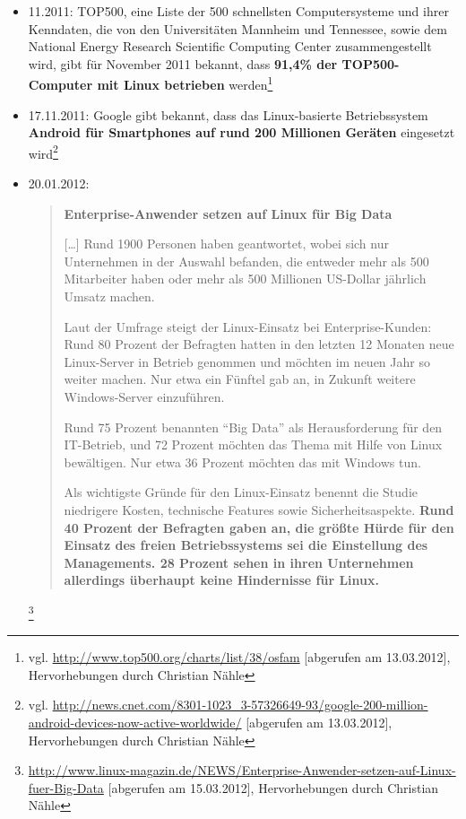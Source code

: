 \documentclass[a4paper]{scrartcl}
\begin{document}
\begin{itemize}
\item 11.2011: TOP500, eine Liste der 500 schnellsten Computersysteme und ihrer
  Kenndaten, die von den Universitäten Mannheim und Tennessee, sowie dem
  National Energy Research Scientific Computing Center zusammengestellt wird,
  gibt für November 2011 bekannt, dass \textbf{91,4\% der TOP500-Computer mit
    Linux betrieben}
  werden\footnote{vgl. \url{http://www.top500.org/charts/list/38/osfam}
    [abgerufen am 13.03.2012], Hervorhebungen durch Christian Nähle}

\item 17.11.2011: Google gibt bekannt, dass das Linux-basierte Betriebssystem
  \textbf{Android für Smartphones auf rund 200 Millionen Geräten} eingesetzt
  wird\footnote{vgl.
    \url{http://news.cnet.com/8301-1023_3-57326649-93/google-200-million-android-devices-now-active-worldwide/}
    [abgerufen am 13.03.2012], Hervorhebungen durch Christian Nähle}

\item 20.01.2012: \begin{quote}\textbf{Enterprise-Anwender setzen auf Linux für
      Big Data}

[\ldots] Rund 1900 Personen haben geantwortet, wobei sich nur Unternehmen
in der Auswahl befanden, die entweder mehr als 500 Mitarbeiter haben
oder mehr als 500 Millionen US{}-Dollar jährlich Umsatz machen.

Laut der Umfrage steigt der Linux-Einsatz bei Enterprise-Kunden: Rund 80
Prozent der Befragten hatten in den letzten 12 Monaten neue
Linux-Server in Betrieb genommen und möchten im neuen Jahr so weiter
machen. Nur etwa ein Fünftel gab an, in Zukunft weitere
Windows-Server einzuführen.

Rund 75 Prozent benannten ``Big Data'' als
Herausforderung für den IT-Betrieb, und 72 Prozent möchten das
Thema mit Hilfe von Linux bewältigen. Nur etwa 36 Prozent möchten
das mit Windows tun.

Als wichtigste Gründe für den Linux-Einsatz benennt die Studie niedrigere
Kosten, technische Features sowie Sicherheitsaspekte.  \textbf{Rund 40 Prozent
  der Befragten gaben an, die größte Hürde für den Einsatz des freien
  Betriebssystems sei die Einstellung des Managements.  28 Prozent sehen in
  ihren Unternehmen allerdings überhaupt keine Hindernisse für
  Linux.}\end{quote}\footnote{\url{http://www.linux-magazin.de/NEWS/Enterprise-Anwender-setzen-auf-Linux-fuer-Big-Data}
[abgerufen am 15.03.2012], Hervorhebungen durch Christian Nähle}


\end{itemize}
\end{document}
